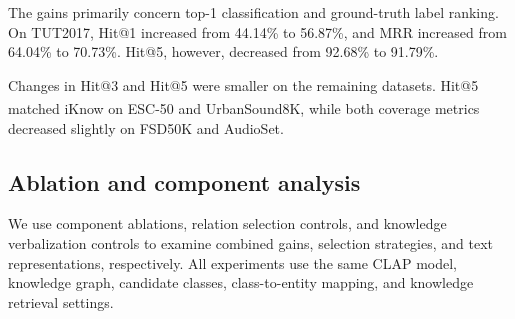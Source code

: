 The gains primarily concern top-1 classification and ground-truth label ranking. On TUT2017, Hit@1 increased from 44.14\% to 56.87\%, and MRR increased from 64.04\% to 70.73\%. Hit@5, however, decreased from 92.68\% to 91.79\%. 

Changes in Hit@3 and Hit@5 were smaller on the remaining datasets. Hit@5 matched iKnow\textsuperscript{\dag} on ESC-50 and UrbanSound8K, while both coverage metrics decreased slightly on FSD50K and AudioSet. 




\subsection{Ablation and component analysis}\label{sec:ablation}
We use component ablations, relation selection controls, and knowledge verbalization controls to examine combined gains, selection strategies, and text representations, respectively. All experiments use the same CLAP model, knowledge graph, candidate classes, class-to-entity mapping, and knowledge retrieval settings.





